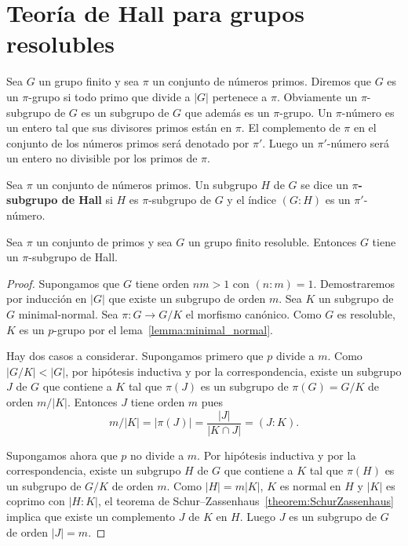 \chapter{Teoría de Hall para grupos resolubles}
\label{Hall}

\medskip
{}
Sea $G$ un grupo finito y sea $\pi$ un conjunto de números primos. Diremos que
$G$ es un $\pi$-grupo si todo primo que divide a $|G|$ pertenece a $\pi$.
Obviamente un $\pi$-subgrupo de $G$ es un subgrupo de $G$ que además es un
$\pi$-grupo. Un $\pi$-número es un entero tal que sus divisores primos están en
$\pi$. El complemento de $\pi$ en el conjunto de los números primos será
denotado por $\pi'$. Luego un $\pi'$-número será un entero no divisible por los
primos de $\pi$.

\begin{definition}
	Sea $\pi$ un conjunto de números primos. Un subgrupo $H$ de $G$ se dice un
	\textbf{$\pi$-subgrupo de Hall} si $H$ es $\pi$-subgrupo de $G$ y el índice $(G:H)$
	es un $\pi'$-número.
\end{definition}

\begin{theorem}[Hall]
	\label{theorem:HallE}
	Sea $\pi$ un conjunto de primos y sea $G$ un grupo finito resoluble. Entonces
	$G$ tiene un $\pi$-subgrupo de Hall.
\end{theorem}

\begin{proof}
	Supongamos que $G$ tiene orden $nm>1$ con $(n:m)=1$. Demostraremos por
	inducción en $|G|$ que 	existe un subgrupo de orden $m$. Sea $K$ un
	subgrupo de $G$ minimal-normal. Sea $\pi\colon G\to G/K$ el morfismo
	canónico.  Como $G$ es resoluble, $K$ es un $p$-grupo por el
	lema~\ref{lemma:minimal_normal}.
	
	Hay dos casos a considerar.  Supongamos primero que $p$ divide a $m$. Como
	$|G/K|<|G|$, por hipótesis inductiva y por la correspondencia, existe un
	subgrupo $J$ de $G$ que contiene a $K$ tal que $\pi(J)$ es un subgrupo de
	$\pi(G)=G/K$ de orden $m/|K|$. Entonces $J$ tiene orden $m$ pues 
	\[
	m/|K|=|\pi(J)|=\frac{|J|}{|K\cap J|}=(J:K).
	\]

	Supongamos ahora que $p$ no divide a $m$. Por hipótesis inductiva y por la
	correspondencia, existe un subgrupo $H$ de $G$ que contiene a $K$ tal que
	$\pi(H)$ es un subgrupo de $G/K$ de orden $m$.  Como $|H|=m|K|$, $K$ es
	normal en $H$ y $|K|$ es coprimo con $|H:K|$, el teorema de
	Schur--Zassenhaus~\ref{theorem:SchurZassenhaus} implica que existe un
	complemento $J$ de $K$ en $H$. Luego $J$ es un subgrupo de $G$ de orden
	$|J|=m$.
\end{proof}

